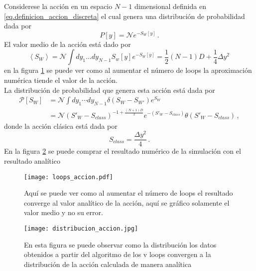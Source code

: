 Considerese la acción en un espacio $N-1$ dimensional definida en \eqref{eq.definicion_accion_discreta} el cual genera una distribución de probabilidad dada por 
\begin{equation}
P [y] = \mathcal{N} e^{-S _{W} [y]}
\, .
\end{equation}
El valor medio de la acción está dado por
\begin{equation}
\left< S _W \right> = 
\mathcal{N} \int dy _1 ... dy _{N-1} S _w [y] e^{-S _{W} [y]} =
\frac{1}{2} (N-1) D + \frac{1}{4} \Delta y ^2 
\,
\end{equation}
en la figura \ref{fig:convergencia_loops} se puede ver como al aumentar el número de loops la aproximación numérica tiende el valor de la acción. \\



La distribución de probabilidad que genera esta acción está dada por
\begin{align}
\mathcal{P} [S _W] &=  \mathcal{N} \int d y_1 \dotsb d y_{N-1} \delta \left( S_W - S_{W'}  \right) e ^{S_W}  \\
&=
 \mathcal{N} \left(  S' _W - S_{class} \right) ^{-1 + \frac{(N+1) D}{2}}
e ^{-\left( S' _W - S_{class} \right)}
\theta \left( S ' _W - S _{class} \right)
\, ,
\nonumber
\end{align}
donde la acción clásica está dada por
\begin{equation}
S _{class} = \frac{\Delta y ^2}{ 4}
\, .
\end{equation}
En la figura \ref{fig:distribucion_accion_cap4} se puede comprar el resultado numérico de la simulación con el resultado analítico 




\begin{figure}
    \centering
    \texttt{[image: loops\_accion.pdf]}
    \caption{Aquí se puede ver como al aumentar el número de loops el resultado converge al valor analítico de la acción, aquí se gráfico solamente el valor medio y no su error. }
    \label{fig:convergencia_loops}
\end{figure}

\begin{figure}
    \centering
    \texttt{[image: distribucion\_accion.jpg]}
    \caption{En esta figura se puede observar como la distribución los datos obtenidos a partir del algoritmo de los v loops convergen a la distribución de la acción calculada de manera analítica}
    \label{fig:distribucion_accion_cap4}
\end{figure}



